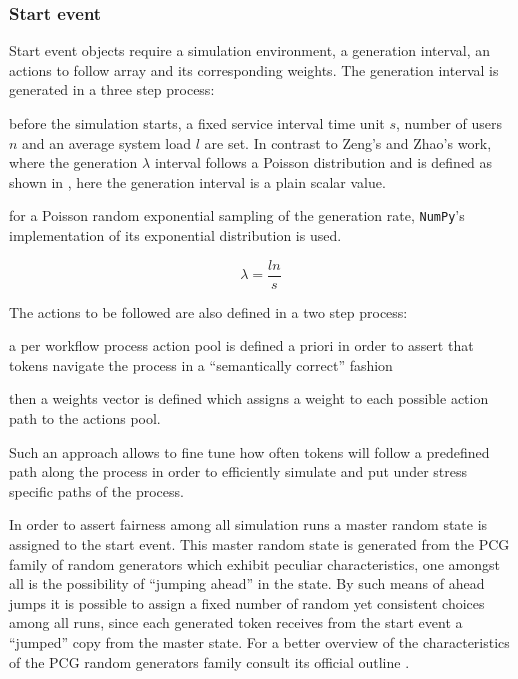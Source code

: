 \documentclass{seal_thesis}
\begin{document}
\subsubsection{Start event}

Start event objects require a simulation environment, a generation interval, an actions to follow array and its corresponding weights. The generation interval is generated in a three step process:
\begin{enumerate*}
 	\item before the simulation starts, a fixed service interval time unit $s$, number of users $n$ and an average system load $l$ are set. In contrast to Zeng's and Zhao's work, where the generation $\lambda$ interval follows a Poisson distribution \cite{Zeng2005} and is defined as shown in , here the generation interval is a plain scalar value.
 	\item for a Poisson random exponential sampling of the generation rate, \texttt{NumPy}'s implementation of its exponential distribution is used.
 \end{enumerate*}

\begin{equation}
\label{eq:generation_interval}
	\lambda = \frac{l n}{s}
\end{equation}

The actions to be followed are also defined in a two step process:
\begin{enumerate*}
	\item a per workflow process action pool is defined a priori in order to assert that tokens navigate the process in a ``semantically correct'' fashion
	\item then a weights vector is defined which assigns a weight to each possible action path to the actions pool.
\end{enumerate*}

Such an approach allows to fine tune how often tokens will follow a predefined path along the process in order to efficiently simulate and put under stress specific paths of the process.

In order to assert fairness among all simulation runs a master random state is assigned to the start event. This master random state is generated from the PCG family of random generators which exhibit peculiar characteristics, one amongst all is the possibility of ``jumping ahead'' in the state. By such means of ahead jumps it is possible to assign a fixed number of random yet consistent choices among all runs, since each generated token receives from the start event a ``jumped'' copy from the master state. For a better overview of the characteristics of the PCG random generators family consult its official outline .
\end{document}
